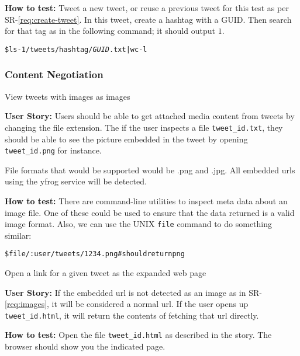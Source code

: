 \begin{Requirements}
\textbf{How to test:} Tweet a new tweet, or reuse a previous tweet for this test
as per SR-\ref{req:create-tweet}. In this tweet, create a hashtag with a GUID.
Then search for that tag as in the following command; it should output $1$.

\begin{alltt}
    \$ ls -1 /tweets/hashtag\texttt{/\textit{GUID}}.txt | wc -l
\end{alltt}

\subsubsection{Content Negotiation}

\item View tweets with images as images\label{req:images}

\textbf{User Story:} Users should be able to get attached media content from
tweets by changing the file extension. The if the user inspects a file
\texttt{tweet\_id.txt}, they should be able to see the picture embedded in the
tweet by opening \texttt{tweet\_id.png} for instance.

File formats that would be supported would be .png and .jpg. All embedded urls
using the yfrog service will be detected.

\textbf{How to test:} There are command-line utilities to inspect meta data
about an image file. One of these could be used to ensure that the data returned
is a valid image format. Also, we can use the UNIX \texttt{file} command to do
something similar:

\begin{alltt}
    \$ file /:user/tweets/1234.png # should return png
\end{alltt}

\item Open a link for a given tweet as the expanded web page

\textbf{User Story:} If the embedded url is not detected as an image as in
SR-\ref{req:images}, it will be considered a normal url. If the user opens up
\texttt{tweet\_id.html}, it will return the contents of fetching that url
directly.

\textbf{How to test:} Open the file \texttt{tweet\_id.html} as described in the
story. The browser should show you the indicated page.

\end{Requirements}

